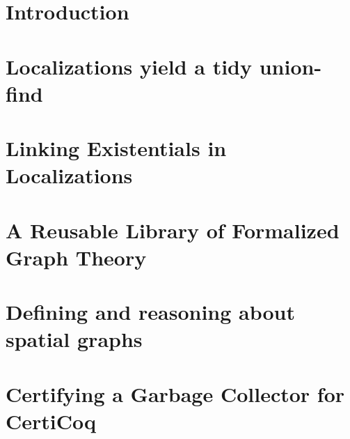 \documentclass[acmsmall,review,anonymous]{acmart}\settopmatter{printfolios=true,printccs=false,printacmref=false}
\begin{document}


\maketitle

\section{Introduction}
\label{dummyref} %
\label{sec:intro}


\section{Localizations yield a tidy union-find}
\label{sec:orientation}


\section{Linking Existentials in Localizations}
\label{sec:localizations}


\section{A Reusable Library of Formalized Graph Theory}
\label{sec:mathgraph}


\section{Defining and reasoning about spatial graphs}
\label{sec:spacegraph}


\section{Certifying a Garbage Collector for CertiCoq}
\label{sec:certigc}

\end{document}
